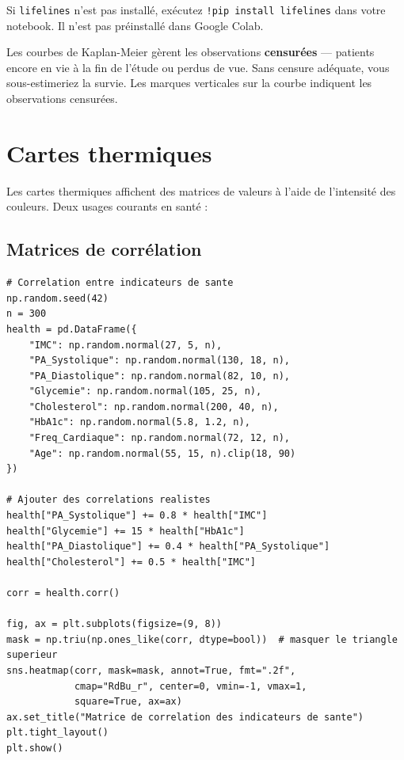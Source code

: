 \begin{warningbox}
Si \texttt{lifelines} n'est pas install\'e, ex\'ecutez \texttt{!pip install lifelines} dans votre notebook. Il n'est pas pr\'einstall\'e dans Google Colab.
\end{warningbox}

\begin{clinicalnote}
Les courbes de Kaplan-Meier g\`erent les observations \textbf{censur\'ees} --- patients encore en vie \`a la fin de l'\'etude ou perdus de vue. Sans censure ad\'equate, vous sous-estimeriez la survie. Les marques verticales sur la courbe indiquent les observations censur\'ees.
\end{clinicalnote}

\section{Cartes thermiques}

Les cartes thermiques affichent des matrices de valeurs \`a l'aide de l'intensit\'e des couleurs. Deux usages courants en sant\'e :

\subsection{Matrices de corr\'elation}

\begin{verbatim}
# Correlation entre indicateurs de sante
np.random.seed(42)
n = 300
health = pd.DataFrame({
    "IMC": np.random.normal(27, 5, n),
    "PA_Systolique": np.random.normal(130, 18, n),
    "PA_Diastolique": np.random.normal(82, 10, n),
    "Glycemie": np.random.normal(105, 25, n),
    "Cholesterol": np.random.normal(200, 40, n),
    "HbA1c": np.random.normal(5.8, 1.2, n),
    "Freq_Cardiaque": np.random.normal(72, 12, n),
    "Age": np.random.normal(55, 15, n).clip(18, 90)
})

# Ajouter des correlations realistes
health["PA_Systolique"] += 0.8 * health["IMC"]
health["Glycemie"] += 15 * health["HbA1c"]
health["PA_Diastolique"] += 0.4 * health["PA_Systolique"]
health["Cholesterol"] += 0.5 * health["IMC"]

corr = health.corr()

fig, ax = plt.subplots(figsize=(9, 8))
mask = np.triu(np.ones_like(corr, dtype=bool))  # masquer le triangle superieur
sns.heatmap(corr, mask=mask, annot=True, fmt=".2f",
            cmap="RdBu_r", center=0, vmin=-1, vmax=1,
            square=True, ax=ax)
ax.set_title("Matrice de correlation des indicateurs de sante")
plt.tight_layout()
plt.show()
\end{verbatim}

